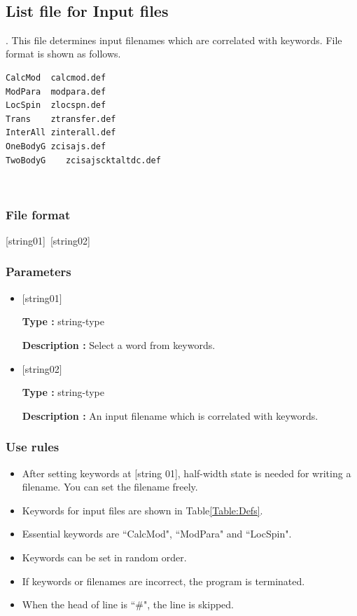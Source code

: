 ~\subsection{List file for Input files}
\label{Subsec:InputFileList}.
This file determines input filenames which are correlated with keywords. File format is shown as follows.\\
\begin{minipage}{10cm}
\begin{screen}
\begin{verbatim}
CalcMod  calcmod.def
ModPara  modpara.def
LocSpin  zlocspn.def
Trans    ztransfer.def
InterAll zinterall.def
OneBodyG zcisajs.def
TwoBodyG	zcisajscktaltdc.def
\end{verbatim}
\end{screen}
\end{minipage}
\\
\subsubsection{File format}
[string01]~[string02]
\subsubsection{Parameters}
 \begin{itemize}
   \item  $[$string01$]$
   
   {\bf Type :} string-type
   
   {\bf Description :} Select a word from keywords.
   
   \item  $[$string02$]$
   
    {\bf Type :} string-type 

   {\bf Description :} An input filename which is correlated with keywords.
 \end{itemize}
\subsubsection{Use rules}
\begin{itemize}
\item  After setting keywords at [string 01], half-width state is needed for writing a filename. You can set the filename freely.
\item Keywords for input files are shown in Table\ref{Table:Defs}.
\item Essential keywords are ``CalcMod", ``ModPara" and ``LocSpin".
\item Keywords can be set in random order.
\item If keywords or filenames are incorrect, the program is terminated. 
\item When the head of line is ``$\#$", the line is skipped.
\end{itemize}

